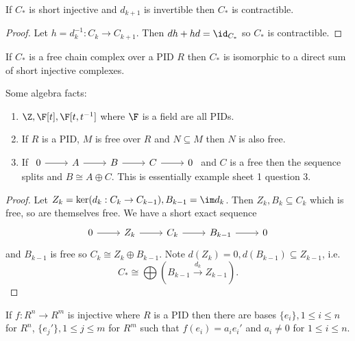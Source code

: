 \documentclass[a4paper]{article}
\begin{document}
\begin{lemma}
  If \(C_*\) is short injective and \(d_{k + 1}\) is invertible then \(C_*\) is contractible.
\end{lemma}

\begin{proof}
  Let \(h = d_k^{-1}: C_k \to C_{k + 1}\). Then \(dh + hd = \id_{C_*}\) so \(C_*\) is contractible.
\end{proof}

\begin{theorem}
  If \(C_*\) is a free chain complex over a PID \(R\) then \(C_*\) is isomorphic to a direct sum of short injective complexes.
\end{theorem}

Some algebra facts:
\begin{enumerate}
\item \(\Z, \F[t], \F[t, t^{-1}]\) where \(\F\) is a field are all PIDs.
\item If \(R\) is a PID, \(M\) is free over \(R\) and \(N \subseteq M\) then \(N\) is also free.
\item If \(
  \begin{tikzcd}
    0 \ar[r] & A \ar[r] & B \ar[r] & C \ar[r] & 0
  \end{tikzcd}
  \) and \(C\) is a free then the sequence splits and \(B \cong A \oplus C\). This is essentially example sheet 1 question 3.
\end{enumerate}

\begin{proof}
  Let \(Z_k = \ker(d_k: C_k \to C_{k - 1}), B_{k - 1} = \im d_k\). Then \(Z_k, B_k \subseteq C_k\) which is free, so are themselves free. We have a short exact sequence
  \[
    \begin{tikzcd}
      0 \ar[r] & Z_k \ar[r] & C_k \ar[r] & B_{k - 1} \ar[r] & 0
    \end{tikzcd}
  \]
  and \(B_{k - 1}\) is free so \(C_k \cong Z_k \oplus B_{k - 1}\). Note \(d(Z_k) = 0, d(B_{k - 1}) \subseteq Z_{k - 1}\), i.e.
  \[
    C_* \cong \bigoplus (B_{k - 1} \xrightarrow{d_k} Z_{k - 1}).
  \]
\end{proof}

\begin{theorem}
  If \(f: R^n \to R^m\) is injective where \(R\) is a PID then there are bases \(\{e_i\}, 1 \leq i \leq n\) for \(R^n\), \(\{e_j'\}, 1 \leq j \leq m\) for \(R^m\) such that \(f(e_i) = a_ie_i'\) and \(a_i \neq 0\) for \(1 \leq i \leq n\).
\end{theorem}
\end{document}
